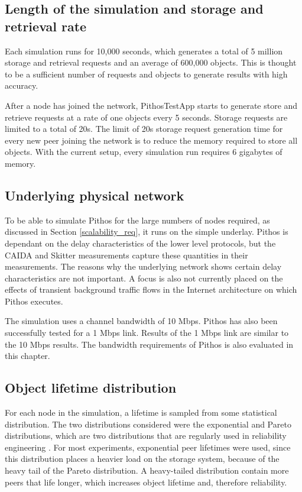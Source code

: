 \subsection{Length of the simulation and storage and retrieval rate}
Each simulation runs for 10,000 seconds, which generates a total of 5 million storage and retrieval requests and an average of 600,000 objects. This is thought to be a sufficient number of requests and objects to generate results with high accuracy.

After a node has joined the network, PithosTestApp starts to generate store and retrieve requests at a rate of one objects every 5 seconds. Storage requests are limited to a total of 20s. The limit of 20s storage request generation time for every new peer joining the network is to reduce the memory required to store all objects. With the current setup, every simulation run requires 6 gigabytes of memory.

\subsection{Underlying physical network}
To be able to simulate Pithos for the large numbers of nodes required, as discussed in Section \ref{scalability_req}, it runs on the simple underlay. Pithos is dependant on the delay characteristics of the lower level protocols, but the CAIDA and Skitter measurements capture these quantities in their measurements. The reasons why the underlying network shows certain delay characteristics are not important. A focus is also not currently placed on the effects of transient background traffic flows in the Internet architecture on which Pithos executes.

The simulation uses a channel bandwidth of 10 Mbps. Pithos has also been successfully tested for a 1 Mbps link. Results of the 1 Mbps link are similar to the 10 Mbps results. The bandwidth requirements of Pithos is also evaluated in this chapter.

\subsection{Object lifetime distribution}
For each node in the simulation, a lifetime is sampled from some statistical distribution. The two distributions considered were the exponential and Pareto distributions, which are two distributions that are regularly used in reliability engineering \cite{rausand2004systemreliability}. For most experiments, exponential peer lifetimes were used, since this distribution places a heavier load on the storage system, because of the heavy tail of the Pareto distribution. A heavy-tailed distribution contain more peers that life longer, which increases object lifetime and, therefore reliability.


